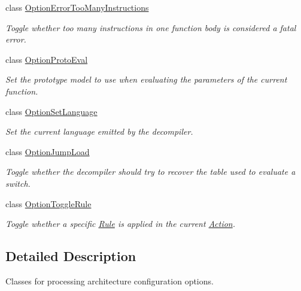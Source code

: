 \begin{DoxyCompactItemize}
class \mbox{\hyperlink{class_option_error_too_many_instructions}{Option\+Error\+Too\+Many\+Instructions}}
\begin{DoxyCompactList}\small\item\em Toggle whether too many instructions in one function body is considered a fatal error. \end{DoxyCompactList}\item 
class \mbox{\hyperlink{class_option_proto_eval}{Option\+Proto\+Eval}}
\begin{DoxyCompactList}\small\item\em Set the prototype model to use when evaluating the parameters of the {\itshape current} function. \end{DoxyCompactList}\item 
class \mbox{\hyperlink{class_option_set_language}{Option\+Set\+Language}}
\begin{DoxyCompactList}\small\item\em Set the current language emitted by the decompiler. \end{DoxyCompactList}\item 
class \mbox{\hyperlink{class_option_jump_load}{Option\+Jump\+Load}}
\begin{DoxyCompactList}\small\item\em Toggle whether the decompiler should try to recover the table used to evaluate a switch. \end{DoxyCompactList}\item 
class \mbox{\hyperlink{class_option_toggle_rule}{Option\+Toggle\+Rule}}
\begin{DoxyCompactList}\small\item\em Toggle whether a specific \mbox{\hyperlink{class_rule}{Rule}} is applied in the current \mbox{\hyperlink{class_action}{Action}}. \end{DoxyCompactList}\end{DoxyCompactItemize}


\subsection{Detailed Description}
Classes for processing architecture configuration options. 

